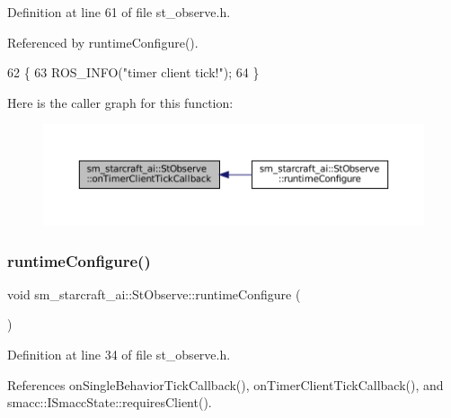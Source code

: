 Definition at line 61 of file st\+\_\+observe.\+h.



Referenced by runtime\+Configure().


\begin{DoxyCode}
62     \{
63         ROS\_INFO(\textcolor{stringliteral}{"timer client tick!"});
64     \}
\end{DoxyCode}
Here is the caller graph for this function\+:
\nopagebreak
\begin{figure}[H]
\begin{center}
\leavevmode
\includegraphics[width=350pt]{structsm__starcraft__ai_1_1StObserve_acb92d67845c27aead231cbf52b13e9c8_icgraph}
\end{center}
\end{figure}
\mbox{\label{structsm__starcraft__ai_1_1StObserve_afcc3c6aecc44b88f421a3e9990f7efb4}} 
\subsubsection{\texorpdfstring{runtime\+Configure()}{runtimeConfigure()}}
{\footnotesize\ttfamily void sm\+\_\+starcraft\+\_\+ai\+::\+St\+Observe\+::runtime\+Configure (\begin{DoxyParamCaption}{ }\end{DoxyParamCaption})\hspace{0.3cm}{\ttfamily [inline]}}



Definition at line 34 of file st\+\_\+observe.\+h.



References on\+Single\+Behavior\+Tick\+Callback(), on\+Timer\+Client\+Tick\+Callback(), and smacc\+::\+I\+Smacc\+State\+::requires\+Client().


